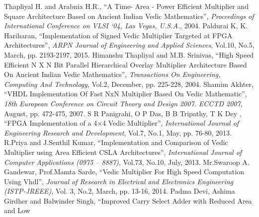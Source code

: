 \begin{thebibliography}{1}
 Thapliyal H. and Arabnia H.R., ``A Time- Area - Power Efficient Multiplier and Square Architecture Based on Ancient Indian Vedic Mathematics'', \emph{Proceedings of International Conference on VLSI ‘04, Las Vegas, U.S.A.}, 2004.
 Paldurai K, K. Hariharan, ``Implementation of Signed Vedic Multiplier Targeted at FPGA Architectures'', \emph{ARPN Journal of Engineering and Applied Sciences}, Vol.10, No.5, March, pp. 2193-2197, 2015.
 Himanshu Thapliyal and M.B. Srinivas, ``High Speed Efficient N X N Bit Parallel Hierarchical Overlay Multiplier Architecture Based On Ancient Indian Vedic Mathematics'', \emph{Transactions On Engineering, Computing And Technology}, Vol.2, December, pp. 225-228, 2004.
 Shamim Akhter, ``VHDL Implementation Of Fast NxN Multiplier Based On Vedic Mathematic'', \emph{18th European Conference on Circuit Theory and Design 2007. ECCTD 2007}, August, pp. 472-475, 2007.
 S R Panigrahi, O P Das, B B Tripathy, T K Dey , ``FPGA Implementation of a 4×4 Vedic Multiplier'', \emph{International Journal of Engineering Research and Development}, Vol.7, No.1, May, pp. 76-80, 2013.
 R.Priya and J.Senthil Kumar, ``Implementation and Comparison of Vedic Multiplier using Area Efficient CSLA Architectures'', \emph{International Journal of Computer Applications (0975 – 8887)}, Vol.73, No.10, July, 2013.
 Mr.Swaroop A. Gandewar, Prof.Mamta Sarde, ``Vedic Multiplier For High Speed Computation Using Vhdl'', \emph{Journal of Research in Electrical and Electronics Engineering (ISTP-JREEE)}, Vol. 3, No.2, March, pp. 13-16, 2014.
 Padma Devi, Ashima Girdher and Balwinder Singh, ``Improved Carry Select Adder with Reduced Area and Low

\end{thebibliography}
